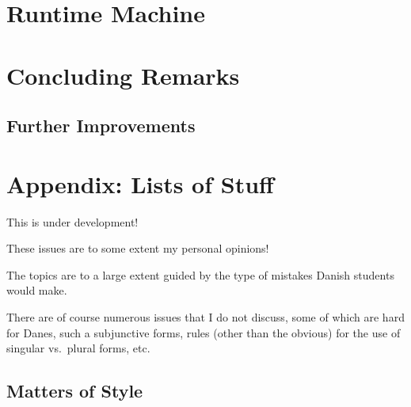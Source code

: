 \documentclass[a4paper,12pt]{report}
\begin{document}
\chapter{Runtime Machine}

\chapter{Concluding Remarks}
\section{Further Improvements}





\appendix

\newpage

\chapter*{Appendix: Lists of Stuff}
\label{appendix}
This is under development!

These issues are to some extent my personal opinions!

The topics are to a large extent guided by the type of mistakes Danish
students would make.

There are of course numerous issues that I do not discuss, some of
which are hard for Danes, such a subjunctive forms, rules (other
than the obvious) for the use of singular vs.\ plural forms, etc.

\section*{Matters of Style}
\end{document}
